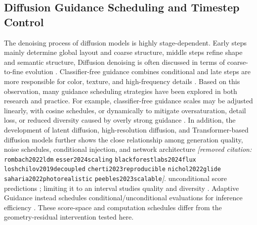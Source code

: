 \documentclass[times,twocolumn,final]{elsarticle}
\providecommand{\DIFadd}[1]{{\protect\color{blue} \sf #1}} %
\providecommand{\DIFdel}[1]{{\protect\color{red} \scriptsize #1}} %
\providecommand{\DIFaddbegin}{} %
\providecommand{\DIFaddend}{} %
\providecommand{\DIFdelbegin}{} %
\providecommand{\DIFdelend}{} %
\begin{document}
\subsection{Diffusion Guidance Scheduling and Timestep Control}
\label{subsec:guidance}

\DIFdelbegin \DIFdel{The denoising process of diffusion models is highly stage-dependent. Early steps mainly determine global layout and coarse structure, middle steps refine shape and semantic structure, }\DIFdelend \DIFaddbegin \DIFadd{Diffusion denoising is often discussed in terms of coarse-to-fine evolution \cite{ho2020ddpm,song2021ddim}. Classifier-free guidance combines conditional }\DIFaddend and \DIFdelbegin \DIFdel{late steps are more responsible for color, texture, and high-frequency details \cite{ho2020ddpm,song2021ddim}. Based on this observation, many guidance scheduling strategies have been explored in both research and practice. For example, classifier-free guidance scales may be adjusted linearly, with cosine schedules, or dynamically to mitigate oversaturation, detail loss, or reduced diversity caused by overly strong guidance \cite{ho2022cfg,castillo2023adaptive}. In addition, the development of latent diffusion, high-resolution diffusion, and Transformer-based diffusion models further shows the close relationship among generation quality, noise schedules, conditional injection, and network architecture \textit{[removed citation: }\texttt{rombach2022ldm} \texttt{esser2024scaling} \texttt{blackforestlabs2024flux} \texttt{loshchilov2019decoupled} \texttt{cherti2023reproducible} \texttt{nichol2022glide} \texttt{saharia2022photorealistic} \texttt{peebles2023scalable}\textit{]}. }\DIFdelend \DIFaddbegin \DIFadd{unconditional score predictions \cite{ho2022cfg}; limiting it to an interval studies quality and diversity \cite{kynkanniemi2024limited}. Adaptive Guidance instead schedules conditional/unconditional evaluations for inference efficiency \cite{castillo2023adaptive}. These score-space and computation schedules differ from the geometry-residual intervention tested here.
}\DIFaddend 
\end{document}
